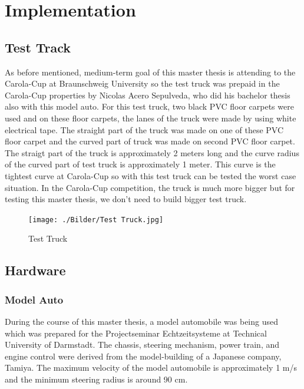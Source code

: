 %
\chapter{Implementation}\label{cha:Implementation}
%
\section{Test Track}\label{sec:Test Track}



As before mentioned, medium-term goal of this master thesis is attending to the Carola-Cup at Braunschweig University 
so the test truck was prepaid in the Carola-Cup properties by Nicolas Acero Sepulveda, who did his bachelor thesis also
with this model auto. For this test truck, two black PVC floor carpets were used and on these floor carpets, the lanes 
of the truck were made by using white electrical tape. The straight part of the truck was made on one of these PVC 
floor carpet and the curved part of truck was made on second PVC floor carpet. The straigt part of the truck is 
approximately 2 meters long and the curve radius of the curved part of test truck is approximately 1 meter. This curve 
is the tightest curve at Carola-Cup so with this test truck can be tested the worst case situation. In the Carola-Cup 
competition, the truck is much more bigger but for testing this master thesis, we don't need to build bigger test truck.

\begin{figure}[H]
	\centering
	\hspace*{0cm}   
	\texttt{[image: ./Bilder/Test Truck.jpg]}
	\caption{Test Truck}
\end{figure}

%
\section{Hardware}\label{sec:Hardware}



%
\subsection{Model Auto}\label{sec:Model Auto}


During the course of this master thesis, a model automobile was being used which was prepared for the Projectseminar 
Echtzeitsysteme at Technical University of Darmstadt. The chassis, steering mechanism, power train, and engine control 
were derived from the model-building of a Japanese company, Tamiya. The maximum velocity of the model automobile is 
approximately 1 m/s and the minimum steering radius is around 90 cm. 

